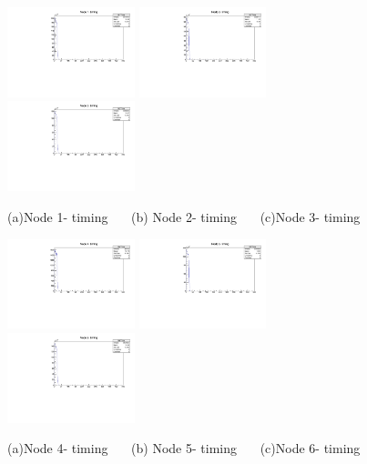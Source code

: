 \documentclass[a4paper,11pt]{article}
\theoremstyle{mytheor}
\begin{document}
\begin{figure}[H] 
\vspace*{-0.3cm} 
\includegraphics[width=0.33\textwidth,scale=0.5,trim=0 0 0 0,clip]{plotsdir/file0_test-N1Time-1.pdf} 
\includegraphics[width=0.33\textwidth,scale=0.5,trim=0 0 0 0,clip]{plotsdir/file0_test-N2Time-1.pdf} 
\includegraphics[width=0.33\textwidth,scale=0.5,trim=0 0 0 0,clip]{plotsdir/file0_test-N3Time-1.pdf} 
\caption{(a)Node 1- timing ~~~(b) Node 2- timing ~~~(c)Node 3- timing } 
\end{figure} 
\begin{figure}[H] 
\vspace*{-0.3cm} 
\includegraphics[width=0.33\textwidth,scale=0.5,trim=0 0 0 0,clip]{plotsdir/file0_test-N4Time-1.pdf} 
\includegraphics[width=0.33\textwidth,scale=0.5,trim=0 0 0 0,clip]{plotsdir/file0_test-N5Time-1.pdf} 
\includegraphics[width=0.33\textwidth,scale=0.5,trim=0 0 0 0,clip]{plotsdir/file0_test-N6Time-1.pdf} 
\caption{(a)Node 4- timing ~~~(b) Node 5- timing ~~~(c)Node 6- timing } 
\end{figure} 
\end{document}
